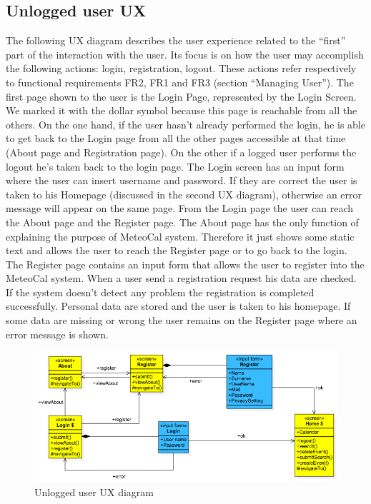 \documentclass[10pt,a4paper,titlepage]{article}
\begin{document}
\subsection{Unlogged user UX}
The following UX diagram describes the user experience related to the “first” part of the interaction with the user. Its focus is on how the user may accomplish the following actions: login, registration, logout. These actions refer respectively to functional requirements FR2, FR1 and FR3 (section “Managing User”).
The first page shown to the user is the Login Page, represented by the Login Screen. We marked it with the dollar symbol because this page is reachable from all the others. On the one hand, if the user hasn’t already performed the login, he is able to get back to the Login page from all the other pages accessible at that time (About page and Registration page). On the other if a logged user performs the logout he’s taken back to the login page. 
The Login screen has an input form where the user can insert username and password. If they are correct the user is taken to his Homepage (discussed in the second UX diagram), otherwise an error message will appear on the same page. From the Login page the user can reach the About page and the Register page.
The About page has the only function of explaining the purpose of MeteoCal system. Therefore it just shows some static text and allows the user to reach the Register page or to go back to the login.
The Register page contains an input form that allows the user to register into the MeteoCal system. When a user send a registration request his data are checked. If the system doesn’t detect any problem the registration is completed successfully. Personal data are stored and the user is taken to his homepage. If some data are missing or wrong the user remains on the Register page where an error message is shown.
\begin{figure}[h]
\centering
\includegraphics[width=\linewidth]{./images/UX_unlogged}
\caption[Unlogged ux]{Unlogged user UX diagram}
\label{fig:UX_unlogged}
\end{figure}
\end{document}
